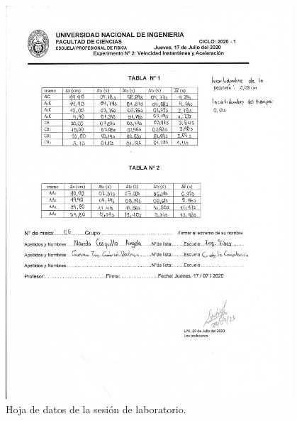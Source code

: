 \documentclass[../main]{subfiles}
\begin{document}
\begin{figure}[H]
  \begin{center}
    \includegraphics[width=0.95\textwidth]{res/lab_data.png}
  \end{center}
  \caption{Hoja de datos de la sesión de laboratorio.}\label{fig:lab_data}
\end{figure}
\end{document}
